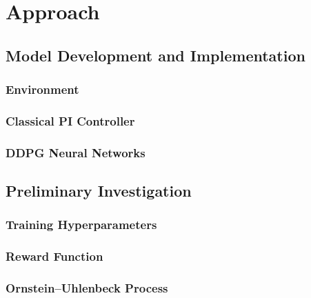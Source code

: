 \chapter{Approach}


\section{Model Development and Implementation}


\subsection{Environment}


\subsection{Classical PI Controller}


\subsection{DDPG Neural Networks}



\section{Preliminary Investigation}


\subsection{Training Hyperparameters}


\subsection{Reward Function}


\subsection{Ornstein–Uhlenbeck Process}

